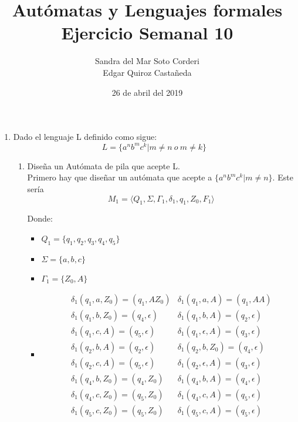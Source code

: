 \documentclass{article}
\begin{document}
    \title{
        Autómatas y Lenguajes formales \\
        Ejercicio Semanal 10
    }

    \author{
        Sandra del Mar Soto Corderi \\
        Edgar Quiroz Castañeda
    }

    \date{
        26 de abril del 2019
    }

    \maketitle

    \begin{enumerate}
        \item {
        Dado el lenguaje L definido como sigue:
        \begin{equation*}
        	L = \{a^nb^mc^k | m \neq n \ o \   m \neq k \}
        \end{equation*}


        \begin{enumerate}
        	\item {
        	Diseña un Autómata de pila que acepte L.\\
         	Primero hay que diseñar un autómata que acepte a $\{a^nb^mc^k | m \neq n \}$.
         	Este sería
         	\[M_1 = \langle Q_1 , \Sigma, \Gamma_1 , \delta_1, q_1 , Z_0,  F_1\rangle\]

	         Donde:

	         \begin{itemize}
	         	\item {
	         		$Q_1 = \{q_1, q_2, q_3, q_4, q_5\}$
	         	}
	         	\item {
	         		$\Sigma = \{a, b,c\}$
	         	}
	         	\item {
	         		$\Gamma_1 = \{Z_0, A\}$
	         	}

				\item {
					\begin{align*}
						&\delta_1 (q_1, a, Z_0) = (q_1, AZ_0)
						&\delta_1 (q_1, a, A) = (q_1, AA) \\
						&\delta_1 (q_1, b, Z_0) = (q_4, \epsilon)
						&\delta_1 (q_1, b, A) = (q_2, \epsilon) \\
						&\delta_1 (q_1, c, A) = (q_5, \epsilon)
						&\delta_1 (q_1, \epsilon, A) = (q_3, \epsilon) \\
						&\delta_1 (q_2, b, A) = (q_2, \epsilon)
						&\delta_1 (q_2, b, Z_0) = (q_4, \epsilon) \\
						&\delta_1 (q_2, c, A) = (q_5, \epsilon)
						&\delta_1 (q_2, \epsilon, A) = (q_3, \epsilon) \\
						&\delta_1 (q_4, b, Z_0) = (q_4, Z_0)
						&\delta_1 (q_4, b, A) = (q_4, \epsilon) \\
						&\delta_1 (q_4, c, Z_0) = (q_5, Z_0)
						&\delta_1 (q_4, c, A) = (q_5, \epsilon) \\
						&\delta_1 (q_5, c, Z_0) = (q_5, Z_0)
						&\delta_1 (q_5, c, A) = (q_5, \epsilon)
	         		\end{align*}
				}



\end{itemize}}
\end{enumerate}}
\end{enumerate}
\end{document}
